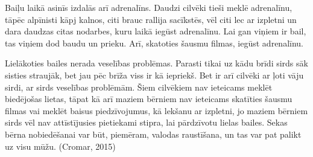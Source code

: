 \documentclass[12pt]{article}
\begin{document}
Baiļu laikā asinīs izdalās arī adrenalīns. Daudzi cilvēki tieši meklē adrenalīnu, tāpēc alpīnisti kāpj kalnos, citi brauc rallija sacīkstēs, vēl citi lec ar izpletni un dara daudzas citas nodarbes, kuru laikā iegūst adrenalīnu. Lai gan viņiem ir bail, tas viņiem dod baudu un prieku. Arī, skatoties šausmu filmas, iegūst adrenalīnu. \par
Lielākoties bailes nerada veselības problēmas. Parasti tikai uz kādu brīdi sirds sāk sisties straujāk, bet jau pēc brīža viss ir kā iepriekš. Bet ir arī cilvēki ar ļoti vāju sirdi, ar sirds veselības problēmām. Šiem cilvēkiem nav ieteicams meklēt biedējošas lietas, tāpat kā arī maziem bērniem nav ieteicams skatīties šausmu filmas vai meklēt baisus piedzīvojumus, kā lekšanu ar izpletni, jo maziem bērniem sirds vēl nav attīstījusies pietiekami stipra, lai pārdzīvotu lielas bailes. Sekas bērna nobiedēšanai var būt, piemēram, valodas raustīšana, un tas var pat palikt uz visu mūžu. (Cromar, 2015)

\end{document}
